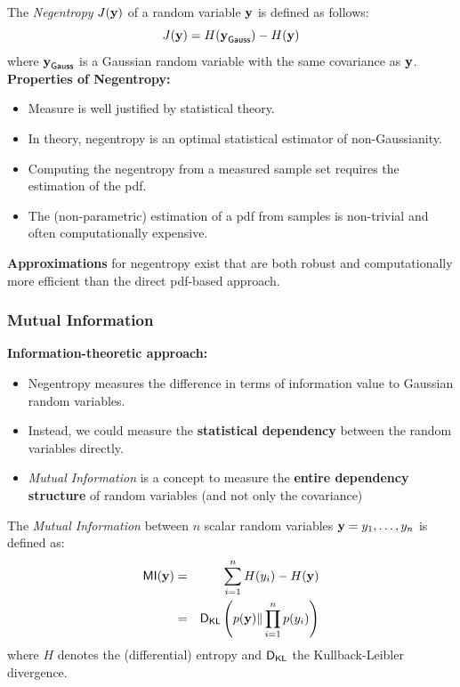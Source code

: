  The \textit{Negentropy} $J(\bm{\mathrm{y}})$ of a random variable $\bm{\mathrm{y}}$ is defined as follows:
    \begin{displaymath}
      J(\bm{\mathrm{y}}) = H(\bm{\mathrm{y}}_{\mathsf{Gauss}}) - H(\bm{\mathrm{y}})
    \end{displaymath}
where $\bm{\mathrm{y}}_{\mathsf{Gauss}}$ is a Gaussian random variable with the same covariance as $\bm{\mathrm{y}}$.\\[0.3cm]
 \textbf{Properties of Negentropy:}
  \begin{itemize}
    \item Measure is well justified by statistical theory.
    \item In theory, negentropy is an optimal statistical estimator of non-Gaussianity.     
    \item Computing the negentropy from a measured sample set requires the estimation of the pdf.            
    \item The (non-parametric) estimation of a pdf from samples is non-trivial and often computationally expensive.
  \end{itemize}
 \textbf{Approximations} for negentropy exist that are both robust and computationally more efficient than the direct pdf-based approach.
         
\subsubsection {Mutual Information}

 \textbf {Information-theoretic approach:}

  \begin{itemize}
    \item Negentropy measures the difference in terms of information value to Gaussian random variables.            
    \item Instead, we could measure the \textbf{statistical dependency} between the random variables directly.            
    \item \textit{Mutual Information} is a concept to measure the \textbf {entire dependency structure} of random variables (and not only the covariance)
  \end{itemize}
          
  The \textit{Mutual Information} between $n$ scalar random variables $\bm{\mathrm{y}} = y_1, \ldots, y_n$ is defined as:
    \begin{eqnarray*}
      \mathop{\mathsf{MI}}(\bm{\mathrm{y}}) &=& \sum_{i = 1}^n H(y_i) - H(\bm{\mathrm{y}}) \\
                  &=& \mathop{\mathsf{D}_{\mathsf{KL}}} \left( p(\bm{\mathrm{y}}) \| \prod_{i=1}^n p(y_i) \right)
    \end{eqnarray*}
    where $H$ denotes the (differential) entropy and $\mathop{\mathsf{D}_{\mathsf{KL}}}$ the Kullback-Leibler divergence.
  
